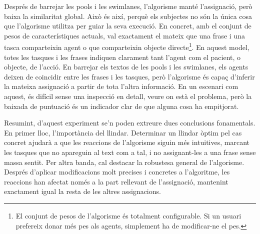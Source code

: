 Després de barrejar les pools i les swimlanes, l'algorisme manté l'assignació, però baixa la similaritat global. Això és així, perquè els subjectes no són la única cosa que l'algorisme utilitza per guiar la seva execució. En concret, amb el conjunt de pesos de característiques actuals, val exactament el mateix que una frase i una tasca comparteixin agent o que comparteixin objecte directe\footnote{El conjunt de pesos de l'algorisme és totalment configurable. Si un usuari prefereix donar més pes als agents, simplement ha de modificar-ne el pes.}. En aquest model, totes les tasques i les frases indiquen clarament tant l'agent com el pacient, o objecte, de l'acció. En barrejar els textos de les pools i les swimlanes, els agents deixen de coincidir entre les frases i les tasques, però l'algorisme és capaç d'inferir la mateixa assignació a partir de tota l'altra informació. En un escenari com aquest, és difícil sense una inspecció en detall, veure on està el problema, però la baixada de puntuació és un indicador clar de que alguna cosa ha empitjorat.

Resumint, d'aquest experiment se'n poden extreure dues conclusions fonamentals. En primer lloc, l'importància del llindar. Determinar un llindar òptim pel cas concret ajudarà a que les reaccions de l'algorisme siguin més intuitives, marcant les tasques que no apareguin al text com a tal, i no assignant-les a una frase sense massa sentit. Per altra banda, cal destacar la robustesa general de l'algorisme. Després d'aplicar modificacions molt precises i concretes a l'algoritme, les reaccions han afectat només a la part rellevant de l'assignació, mantenint exactament igual la resta de les altres assignacions.



